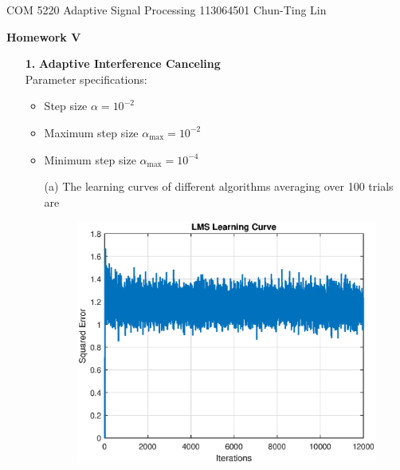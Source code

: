 \documentclass[letterpaper,12pt]{article}
\begin{document}
  \noindent COM 5220 Adaptive Signal Processing \hfill 113064501  Chun-Ting Lin \\

  \begin{center}
    {\bf \large  Homework V}
  \end{center}

  \begin{enumerate}
    \item[{\bf 1. }]  \textbf{Adaptive Interference Canceling} \hfill \\
    Parameter specifications:
    \begin{itemize}
      \item Step size $\alpha = 10^{-2}$
      \item Maximum step size $\alpha_{\text{max}} = 10^{-2}$
      \item Minimum step size $\alpha_{\text{max}} = 10^{-4}$
    \end{itemize}
    \begin{itemize}
      \item[(a)] The learning curves of different algorithms averaging over 100 trials are 
      \begin{figure}[H]
        \centering
        \includegraphics[scale = 0.7]{LMS.eps}
      \end{figure}
      \begin{figure}[H]
        \centering

\end{figure}
\end{itemize}
\end{enumerate}
\end{document}
